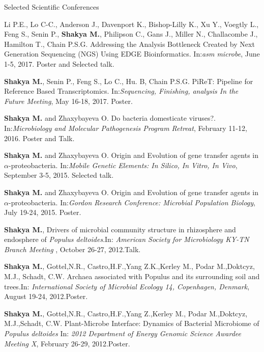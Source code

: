 \documentclass{resume} %
\begin{document}

\begin{rSection}{Selected Scientific Conferences}

\item Li P.E., Lo C-C., Anderson J., Davenport K., Bishop-Lilly K., Xu Y., Voegtly L., Feng S., Senin P., \textbf{Shakya M.}, Philipson C., Gans J., Miller N., Challacombe J., Hamilton T., Chain P.S.G. Addressing the Analysis Bottleneck Created by Next Generation Sequencing (NGS) Using EDGE Bioinformatics. In:\emph{asm microbe}, June 1-5, 2017. Poster and Selected talk.

\item \textbf{Shakya M.}, Senin P., Feng S., Lo C., Hu. B, Chain P.S.G. PiReT: Pipeline for Reference Based Transcriptomics. In:\emph{Sequencing, Finishing, analysis In the Future Meeting}, May 16-18, 2017. Poster.

\item \textbf{Shakya M.} and Zhaxybayeva O. Do bacteria domesticate viruses?. In:\emph{Microbiology and Molecular Pathogenesis Program Retreat}, February 11-12, 2016. Poster and Talk.

\item \textbf{Shakya M.} and Zhaxybayeva O. Origin and Evolution of gene transfer agents in $\alpha$-proteobacteria. In:\emph{Mobile Genetic Elements: In Silico, In Vitro, In Vivo}, September 3-5, 2015. Selected talk.

\item \textbf{Shakya M.} and Zhaxybayeva O. Origin and Evolution of gene transfer agents in $\alpha$-proteobacteria. In:\emph{Gordon Research Conference: Microbial Population Biology}, July 19-24, 2015. Poster.

\item \textbf{Shakya M.}, Drivers of microbial community structure in rhizosphere and endosphere of \textit{Populus deltoides}.In: \emph{American Society for Microbiology KY-TN Branch Meeting }, October 26-27, 2012.Talk.

\item  \textbf{Shakya M.}, Gottel,N.R., Castro,H.F.,Yang Z.K.,Kerley M., Podar M.,Doktcyz, M.J., Schadt, C.W. Archaea associated with Populus and its surrounding soil and trees.In: \emph{International Society of Microbial Ecology 14, Copenhagen, Denmark}, August 19-24, 2012.Poster.

\item \textbf{Shakya M.}, Gottel,N.R., Castro,H.F.,Yang Z.,Kerley M., Podar M.,Doktcyz, M.J.,Schadt, C.W. Plant-Microbe Interface: Dynamics of Bacterial Microbiome of \textit{Populus deltoides}  In: \emph{2012 Department of Energy Genomic Science Awardee Meeting X}, February 26-29, 2012.Poster.


\end{rSection}
\end{document}
